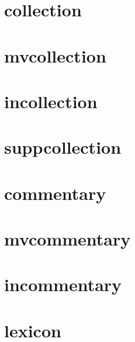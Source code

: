 \documentclass{article}
\begin{document}
\cite[1]{conferencepaper}

\section{collection}

\cite[1]{collection}

\cite[1]{collection}

\section{mvcollection}

\cite[1]{mvcollection}

\cite[1]{mvcollection}

\section{incollection}

\cite[1]{incollection}

\cite[1]{incollection}

\section{suppcollection}

\cite[1]{suppcollection}

\cite[1]{suppcollection}

\section{commentary}

\cite[1]{commentary}

\cite[1]{commentary}

\section{mvcommentary}

\cite[1]{mvcommentary}

\cite[1]{mvcommentary}

\section{incommentary}

\cite[1]{incommentary}

\cite[1]{incommentary}

\section{lexicon}
\end{document}
